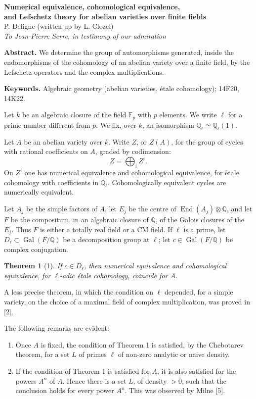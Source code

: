\documentclass[11pt]{article}
\newcommand{\Q}{\mathbb Q}
\newcommand{\Fp}{\mathbb F_p}
\newcommand{\Gal}{\operatorname{Gal}}
\newcommand{\End}{\operatorname{End}}
\theoremstyle{deligne}
\newtheorem*{theorem*}{Theorem}
\newcommand{\heading}[1]{\vspace{0.7em}\noindent{\bfseries #1}\quad}
\begin{document}
\begin{center}
{\Large\bfseries Numerical equivalence, cohomological equivalence,\\
and Lefschetz theory for abelian varieties over finite fields}\\[0.6em]
{\large P. Deligne (written up by L. Clozel)}\\[0.35em]
{\itshape To Jean-Pierre Serre, in testimony of our admiration}
\end{center}

\textbf{Abstract.} We determine the group of automorphisms generated, inside the endomorphisms of the cohomology of an abelian variety over a finite field, by the Lefschetz operators and the complex multiplications.

\textbf{Keywords.} Algebraic geometry (abelian varieties, étale cohomology); 14F20, 14K22.


\heading{1.}
Let $k$ be an algebraic closure of the field $\Fp$ with $p$ elements. We write $\ell$ for a prime number different from $p$. We fix, over $k$, an isomorphism $\Q_\ell\simeq \Q_\ell(1)$.

Let $A$ be an abelian variety over $k$. Write $Z$, or $Z(A)$, for the group of cycles with rational coefficients on $A$, graded by codimension:
\[
 Z=\bigoplus_i Z^i .
\]
On $Z^i$ one has numerical equivalence and cohomological equivalence, for étale cohomology with coefficients in $\Q_\ell$. Cohomologically equivalent cycles are numerically equivalent.

Let $A_j$ be the simple factors of $A$, let $E_j$ be the centre of $\End(A_j)\otimes\Q$, and let $F$ be the compositum, in an algebraic closure of $\Q$, of the Galois closures of the $E_j$. Thus $F$ is either a totally real field or a CM field. If $\ell$ is a prime, let $D_\ell\subset\Gal(F/\Q)$ be a decomposition group at $\ell$; let $c\in\Gal(F/\Q)$ be complex conjugation.

\begin{theorem*}[1]
If $c\in D_\ell$, then numerical equivalence and cohomological equivalence, for $\ell$-adic étale cohomology, coincide for $A$.
\end{theorem*}

A less precise theorem, in which the condition on $\ell$ depended, for a simple variety, on the choice of a maximal field of complex multiplication, was proved in [2].

The following remarks are evident:
\begin{enumerate}[label=(\alph*)]
\item Once $A$ is fixed, the condition of Theorem 1 is satisfied, by the Chebotarev theorem, for a set $L$ of primes $\ell$ of non-zero analytic or naive density.
\item If the condition of Theorem 1 is satisfied for $A$, it is also satisfied for the powers $A^n$ of $A$. Hence there is a set $L$, of density $>0$, such that the conclusion holds for every power $A^n$. This was observed by Milne [5].
\end{enumerate}
\end{document}
